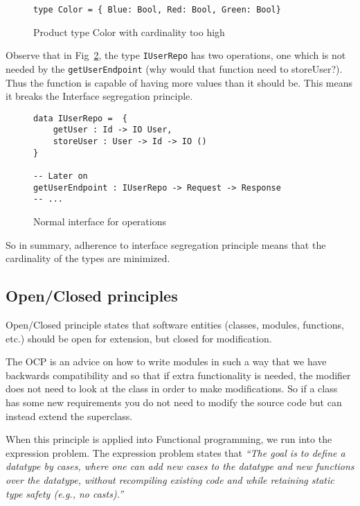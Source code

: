 \begin{figure}[H]
    \begin{lstlisting}
type Color = { Blue: Bool, Red: Bool, Green: Bool}
    \end{lstlisting}
    \caption{Product type Color with cardinality too high}
    \label{colorcardinality}
\end{figure}

Observe that in Fig~\ref{twomanyoperations}, the type \texttt{IUserRepo} has two
operations, one which is not needed by the \texttt{getUserEndpoint} (why would 
that function need to storeUser?). Thus the function is capable of having more 
values than it should be. This means it breaks the Interface segregation principle.

\begin{figure}[H]
    \begin{lstlisting}
data IUserRepo =  {
	getUser : Id -> IO User,
	storeUser : User -> Id -> IO ()
}

-- Later on
getUserEndpoint : IUserRepo -> Request -> Response
-- ...
    \end{lstlisting}
    \caption{Normal interface for operations}
    \label{twomanyoperations}
\end{figure}

So in summary, adherence to interface segregation principle means that the
cardinality of the types are minimized.

\subsection{Open/Closed principles}

Open/Closed principle states that software entities (classes, modules,
functions, etc.) should be open for extension, but closed for modification.

The OCP is an advice on how to write modules in such a way that we have
backwards compatibility and so that if extra functionality is needed, the
modifier does not need to look at the class in order to make modifications. So
if a class has some new requirements you do not need to modify the source code
but can instead extend the superclass.

When this principle is applied into Functional programming, we run into the
expression problem. The expression problem states that \textit{``The goal is to
define a datatype by cases, where one can add new cases to the datatype and new
functions over the datatype, without recompiling existing code and while
retaining static type safety (e.g., no casts).''}

